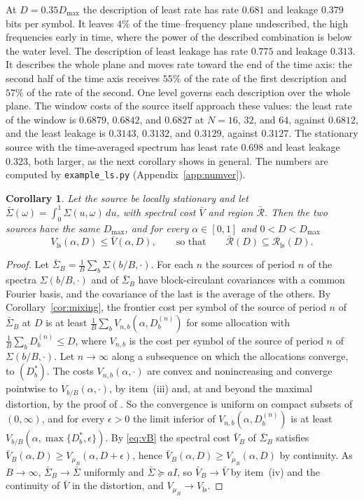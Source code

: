 \documentclass[11pt,onecolumn]{IEEEtran}
\newtheorem{corollary}[theorem]{Corollary}
\newcommand{\Vls}{V_{\mathrm{ls}}}
\begin{document}
\noindent At $D=0.35D_{\max}$ the
description of least rate has rate $0.681$ and leakage $0.379$ bits per
symbol. It leaves $4\%$ of the time--frequency plane undescribed, the
high frequencies early in time, where the power of the described
combination is below the water level. The description of least leakage
has rate $0.775$ and leakage $0.313$. It describes the whole plane and
moves rate toward the end of the time axis: the second half of the
time axis receives $55\%$ of the rate of the first description and
$57\%$ of the rate of the second. One level governs each description
over the whole plane. The window costs of the source itself approach
these values: the least rate of the window is $0.6879$, $0.6842$, and
$0.6827$ at $N=16$, $32$, and $64$, against $0.6812$, and the least
leakage is $0.3143$, $0.3132$, and $0.3129$, against $0.3127$. The
stationary source with the time-averaged spectrum has least rate
$0.698$ and least leakage $0.323$, both larger, as the next corollary
shows in general. The numbers are computed by
\texttt{example\_ls.py} (Appendix~\ref{app:numver}).



\begin{corollary}\label{cor:lsavg}
Let the source be locally stationary and let
$\bar\Sigma(\omega)=\int_0^1\Sigma(u,\omega)\,du$, with spectral cost
$\bar V$ and region $\bar{\mathcal R}$. Then the two sources have the
same $D_{\max}$, and for every $\alpha\in[0,1]$ and $0<D<D_{\max}$
\[
\Vls(\alpha,D)\le\bar V(\alpha,D),\qquad\text{so that}\qquad\bar{\mathcal R}(D)\subseteq\mathcal R_{\mathrm{ls}}(D).
\]
\end{corollary}

\begin{proof}
Let $\bar\Sigma_B=\tfrac1B\sum_b\Sigma(b/B,\cdot)$. For each $n$ the
sources of period $n$ of the spectra $\Sigma(b/B,\cdot)$ and of
$\bar\Sigma_B$ have block-circulant covariances with a common Fourier
basis, and the covariance of the last is the average of the others.
By Corollary~\ref{cor:mixing}, the frontier cost per symbol of the
source of period $n$ of $\bar\Sigma_B$ at $D$ is at least
$\tfrac1B\sum_bV_{n,b}(\alpha,D^{(n)}_b)$ for some allocation with
$\tfrac1B\sum_bD^{(n)}_b\le D$, where $V_{n,b}$ is the cost per symbol of
the source of period $n$ of $\Sigma(b/B,\cdot)$. Let $n\to\infty$ along
a subsequence on which the allocations converge, to $(D^\ast_b)$. The
costs $V_{n,b}(\alpha,\cdot)$ are convex and nonincreasing and converge
pointwise to $V_{b/B}(\alpha,\cdot)$, by item~(iii) and, at and beyond the
maximal distortion, by the proof of \cite[Lemma~11(c)]{part2}. So the
convergence is uniform on compact subsets of $(0,\infty)$, and for
every $\epsilon>0$ the limit inferior of $V_{n,b}(\alpha,D^{(n)}_b)$ is
at least $V_{b/B}(\alpha,\max\{D^\ast_b,\epsilon\})$. By \eqref{eq:vB} the
spectral cost $\bar V_B$ of $\bar\Sigma_B$ satisfies
$\bar V_B(\alpha,D)\ge V_{\mu_B}(\alpha,D+\epsilon)$, hence
$\bar V_B(\alpha,D)\ge V_{\mu_B}(\alpha,D)$ by continuity. As
$B\to\infty$, $\bar\Sigma_B\to\bar\Sigma$ uniformly and
$\bar\Sigma\succeq aI$, so $\bar V_B\to\bar V$ by item~(iv) and the
continuity of $\bar V$ in the distortion, and $V_{\mu_B}\to\Vls$.
\end{proof}
\end{document}
